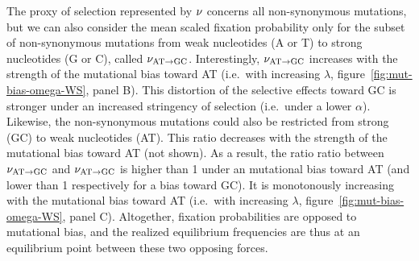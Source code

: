 The proxy of selection represented by $\nu$ concerns all \gls{non-synonymous} mutations, but we can also consider the mean scaled fixation probability only for the subset of \gls{non-synonymous} mutations from weak nucleotides (A or T) to strong nucleotides (G or C), called $\nu_{\text{AT} \rightarrow \text{GC}}$.
Interestingly, $\nu_{\text{AT} \rightarrow \text{GC}}$ increases with the strength of the mutational bias toward AT (i.e.~with increasing $\lambda$, figure~\ref{fig:mut-bias-omega-WS}, panel B).
This distortion of the selective effects toward GC is stronger under an increased stringency of selection (i.e.~under a lower $\alpha$).
Likewise, the \gls{non-synonymous} mutations could also be restricted from strong (GC) to weak nucleotides (AT).
This ratio decreases with the strength of the mutational bias toward AT (not shown).
As a result, the ratio ratio between $\nu_{\text{AT} \rightarrow \text{GC}}$ and $\nu_{\text{AT} \rightarrow \text{GC}}$ is higher than 1 under an mutational bias toward AT (and lower than 1 respectively for a bias toward GC).
It is monotonously increasing with the mutational bias toward AT (i.e.~with increasing $\lambda$, figure~\ref{fig:mut-bias-omega-WS}, panel C).
Altogether, fixation probabilities are opposed to mutational bias, and the realized equilibrium frequencies are thus at an equilibrium point between these two opposing forces.

